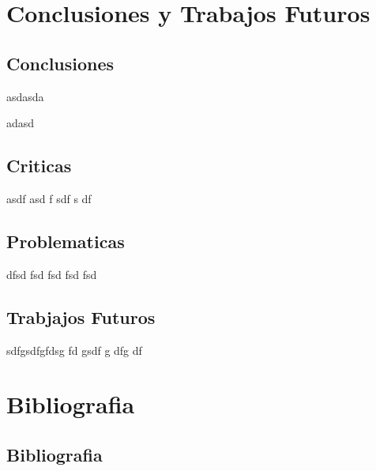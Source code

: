 \chapter{Conclusiones y Trabajos Futuros}

\section{Conclusiones}

asdasda


adasd


\section{Criticas}

asdf
asd
f
sdf
s
df


\section{Problematicas}
 dfsd
 fsd
 fsd
 fsd
 fsd


\section{Trabjajos Futuros}

sdfgsdfgfdsg 
fd gsdf
g dfg
df 

\chapter{Bibliografia}
\section{Bibliografia}

